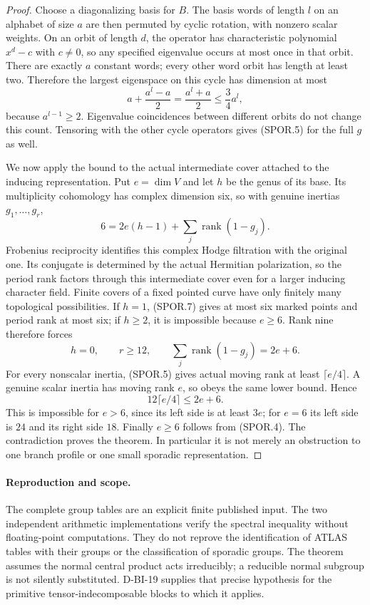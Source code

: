 \begin{proof}
Choose a diagonalizing basis for $B$.  The basis words of length
$l$ on an alphabet of size $a$ are then permuted by cyclic
rotation, with nonzero scalar weights.  On an orbit of length
$d$, the operator has characteristic polynomial $x^d-c$ with
$c\ne0$, so any specified eigenvalue occurs at most once in
that orbit.  There are exactly $a$ constant words; every other
word orbit has length at least two.  Therefore the largest
eigenspace on this cycle has dimension at most
\[
       a+\frac{a^l-a}{2}=\frac{a^l+a}{2}
                  \le\frac34 a^l,                         \tag{SPOR.6}
\]
because $a^{l-1}\ge2$.  Eigenvalue coincidences between different
orbits do not change this count.  Tensoring with the other cycle
operators gives (SPOR.5) for the full $g$ as well.

We now apply the bound to the actual intermediate cover attached
to the inducing representation.  Put $e=\dim V$ and let $h$ be
the genus of its base.  Its multiplicity cohomology has complex
dimension six, so with genuine inertias $g_1,\ldots,g_r$,
\[
       6=2e(h-1)+\sum_j\operatorname{rank}(1-g_j).           \tag{SPOR.7}
\]
Frobenius reciprocity identifies this complex Hodge filtration
with the original one.  Its conjugate is determined by the actual
Hermitian polarization, so the period rank factors through this
intermediate cover even for a larger inducing character field.
Finite covers of a fixed pointed curve have only finitely many
topological possibilities.  If $h=1$, (SPOR.7) gives at most six
marked points and period rank at most six; if $h\ge2$, it is
impossible because $e\ge6$.  Rank nine therefore forces
\[
               h=0,\qquad r\ge12,\qquad
               \sum_j\operatorname{rank}(1-g_j)=2e+6.
                                                               \tag{SPOR.8}
\]
For every nonscalar inertia, (SPOR.5) gives actual moving rank
at least $\lceil e/4\rceil$.  A genuine scalar inertia has moving
rank $e$, so obeys the same lower bound.  Hence
\[
                        12\lceil e/4\rceil\le2e+6.         \tag{SPOR.9}
\]
This is impossible for $e>6$, since its left side is at least
$3e$; for $e=6$ its left side is $24$ and its right side $18$.
Finally $e\ge6$ follows from (SPOR.4).  The contradiction proves
the theorem.  In particular it is not merely an obstruction to
one branch profile or one small sporadic representation.
\end{proof}

\paragraph{Reproduction and scope.}
The complete group tables are an explicit finite published input.
The two independent arithmetic implementations verify the spectral
inequality without floating-point computations.  They do not
reprove the identification of ATLAS tables with their groups or
the classification of sporadic groups.  The theorem assumes the
normal central product acts irreducibly; a reducible normal subgroup
is not silently substituted.  D-BI-19 supplies that precise hypothesis
for the primitive tensor-indecomposable blocks to which it applies.

